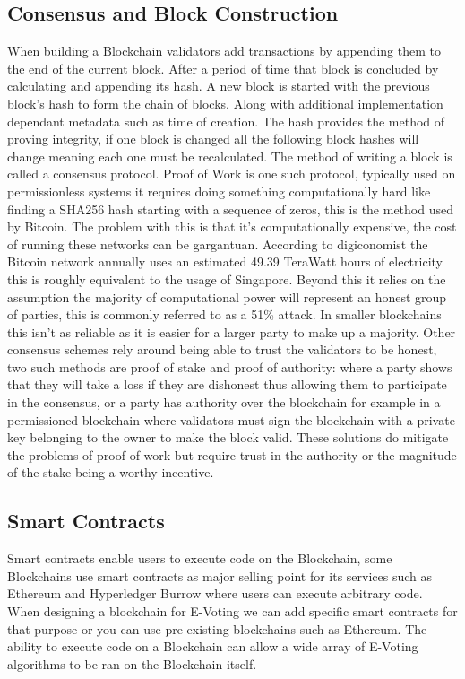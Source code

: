 \documentclass{llncs}
\begin{document}
\subsection{Consensus and Block Construction}
When building a Blockchain validators add transactions by appending them to the end of the current block. After a period of time that block is concluded by calculating and appending its hash. A new block is started with the previous block's hash to form the chain of blocks. Along with additional implementation dependant metadata such as time of creation. The hash provides the method of proving integrity, if one block is changed all the following block hashes will change meaning each one must be recalculated. The method of writing a block is called a consensus protocol. Proof of Work\cite{BTCWhitepaper} is one such protocol, typically used on permissionless systems it requires doing something computationally hard like finding a SHA256 hash starting with a sequence of zeros, this is the method used by Bitcoin. The problem with this is that it's computationally expensive, the cost of running these networks can be gargantuan. According to digiconomist \cite{BTCenergy} the Bitcoin network annually uses an estimated 49.39 TeraWatt hours of electricity this is roughly equivalent to the usage of Singapore. Beyond this it relies on the assumption the majority of computational power will represent an honest group of parties, this is commonly referred to as a 51\% attack\cite{BTCWhitepaper}\cite{baliga2017understanding}. In smaller blockchains this isn't as reliable as it is easier for a larger party to make up a majority. 
Other consensus schemes rely around being able to trust the validators to be honest, two such methods are proof of stake and proof of authority\cite{blockchainBeginners}\cite{baliga2017understanding}: where a party shows that they will take a loss if they are dishonest thus allowing them to participate in the consensus, or a party has authority over the blockchain for example in a permissioned blockchain where validators must sign the blockchain with a private key belonging to the owner to make the block valid. These solutions do mitigate the problems of proof of work but require trust in the authority or the magnitude of the stake being a worthy incentive.

\subsection{Smart Contracts}
Smart contracts enable users to execute code on the Blockchain, some Blockchains use smart contracts as major selling point for its services such as Ethereum \cite{wood2014ethereum} and Hyperledger Burrow \cite{HyperLedgerBurrow} where users can execute arbitrary code. When designing a blockchain for E-Voting we can add specific smart contracts for that purpose or you can use pre-existing blockchains such as Ethereum. The ability to execute code on a Blockchain can allow a wide array of E-Voting algorithms to be ran on the Blockchain itself.
\end{document}
